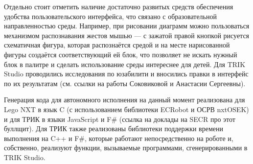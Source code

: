 \documentclass[conference]{IEEEtran}
\begin{document}
Отдельно стоит отметить наличие достаточно развитых средств обеспечения удобства пользовательского 
интерфейса, что связано с образовательной направленностью среды. Например, при рисовании 
диаграмм можно пользоваться механизмом распознавания жестов мышью --- с зажатой правой 
кнопкой рисуется схематичная фигура, которая распознаётся средой и на месте нарисованной 
фигуры создаётся соответствующий ей блок, что позволяет не искать нужный блок в палитре 
и сделать использование среды интереснее для детей. Для TRIK Studio проводились исследования 
по юзабилити и вносились правки в интерфейс по их результатам (см. ссылки на работы Соковиковой и Анастасии Сергеевны).

Генерация кода для автономного исполнения на данный момент реализована для Lego NXT 
в язык C (с использованием библиотеки ECRobot и ОСРВ nxtOSEK) и для ТРИК в языки JavaScript и F\# 
(ссылка на доклады на SECR про этот буллщит). Для ТРИК также реализованы библиотеки 
поддержки времени выполнения на C++ и F\#, которые работают непосредственно на роботе 
и, собственно, реализуют функции, вызываемые программами, сгенерированными в TRIK Studio.
\end{document}
